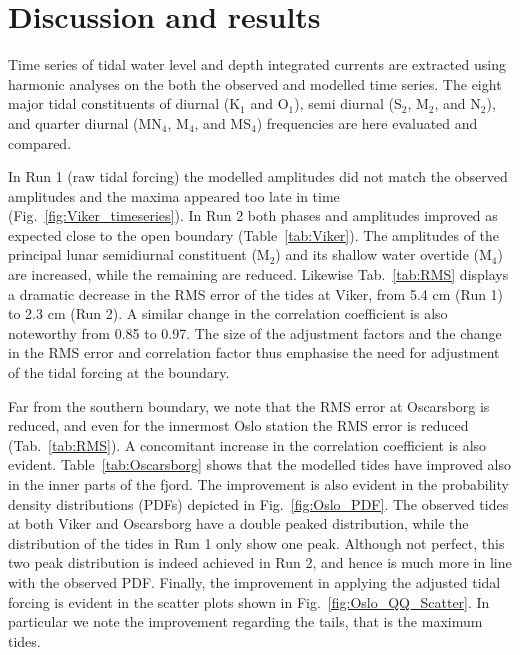 \section{Discussion and results}
\label{sec:discuss}

Time series of tidal water level and depth integrated currents are extracted using harmonic analyses on the both the observed and modelled time series. The eight major tidal constituents of diurnal (K$_1$ and O$_1$), semi diurnal (S$_2$, M$_2$, and N$_2$), and quarter diurnal (MN$_4$, M$_4$, and MS$_4$) frequencies are here evaluated and compared. 

In Run 1 (raw tidal forcing) the modelled amplitudes did not match the observed amplitudes and the maxima appeared too late in time (Fig.~\ref{fig:Viker_timeseries}). In Run 2 both phases and amplitudes improved as expected close to the open boundary (Table~\ref{tab:Viker}). The amplitudes of the principal lunar semidiurnal constituent (M$_2$) and its shallow water overtide (M$_4$) are increased, while the remaining are reduced. Likewise Tab.~\ref{tab:RMS} displays a dramatic decrease in the RMS error of the tides at Viker, from 5.4 cm (Run 1) to 2.3 cm (Run 2). A similar change in the correlation coefficient is also noteworthy from 0.85 to 0.97. The size of the adjustment factors and the change in the RMS error and correlation factor thus emphasise the need for adjustment of the tidal forcing at the boundary. 

Far from the southern boundary, we note that the RMS error at Oscarsborg is reduced, and even for the innermost Oslo station the RMS error is reduced (Tab.~\ref{tab:RMS}). A concomitant increase in the correlation coefficient is also evident. Table~\ref{tab:Oscarsborg} shows that the modelled tides have improved also in the inner parts of the fjord. The improvement is also evident in the probability density distributions (PDFs) depicted in Fig.~\ref{fig:Oslo_PDF}. The observed tides at both Viker and Oscarsborg have a double peaked distribution, while the distribution of the tides in Run 1 only show one peak. Although not perfect, this two peak distribution is indeed achieved in Run 2, and hence is much more in line with the observed PDF. Finally, the improvement in applying the adjusted tidal forcing is evident in the scatter plots shown in Fig.~\ref{fig:Oslo_QQ_Scatter}. In particular we note the improvement regarding the tails, that is the maximum tides.  

